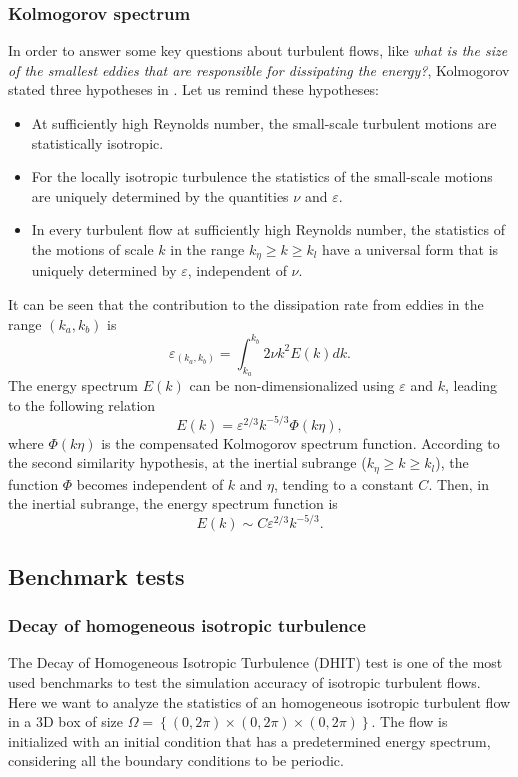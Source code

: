 \subsubsection{Kolmogorov spectrum}
\label{subsubsec-Kolmogorov_spectrum}
In order to answer some key questions about turbulent flows, like \textit{what is the size of the smallest eddies that are responsible for dissipating the energy?}, Kolmogorov stated three hypotheses in \cite{kolmogorov_local_1941}. Let us remind these hypotheses:
\begin{itemize}
\item{} At sufficiently high Reynolds number, the small-scale turbulent motions are statistically isotropic.
\item{} For the locally isotropic turbulence the statistics of the small-scale motions are uniquely determined by the quantities $ \nu $ and $ \varepsilon $.
\item{} In every turbulent flow at sufficiently high Reynolds number, the statistics of the motions of scale $ k $ in the range $ k_\eta\ge k\ge k_l $ have a universal form that is uniquely determined by $ \varepsilon $, independent of $ \nu $.
\end{itemize}

It can be seen that the contribution to the dissipation rate from eddies in the range $ (k_a,k_b) $ is
$$ \varepsilon_{(k_a,k_b)} = \int_{k_a}^{k_b}2\nu k^2E(k)dk.$$
The energy spectrum $ E(k) $ can be non-dimensionalized using $ \varepsilon $ and $ k $, leading to the following relation
$$ E(k) = \varepsilon^{2/3}k^{-5/3}\Phi(k\eta), $$ where $ \Phi(k\eta) $ is the compensated Kolmogorov spectrum function. According to the second similarity hypothesis, at the inertial subrange ($ k_\eta\ge k\ge k_l $), the function $ \Phi $ becomes independent of $ k $ and $ \eta $, tending to a constant $ C $. Then, in the inertial subrange, the energy spectrum function is
\begin{equation}
\label{eq-kolmogorov_spectrum}
E(k)\sim C\varepsilon^{2/3}k^{-5/3}.
\end{equation}

\subsection{Benchmark tests}
\label{subsec-isotropic_tests}

\subsubsection{Decay of homogeneous isotropic turbulence}
\label{subsubsec-C3_DHIT}
The Decay of Homogeneous Isotropic Turbulence (DHIT) test is one of the most used benchmarks to test the simulation accuracy of isotropic turbulent flows. Here we want to analyze the statistics of an homogeneous isotropic turbulent flow in a 3D box of size $\Omega=\left\{(0,2\pi)\times(0,2\pi)\times(0,2\pi)\right\}$. The flow is initialized with an initial condition that has a predetermined energy spectrum, considering all the boundary conditions to be periodic.

